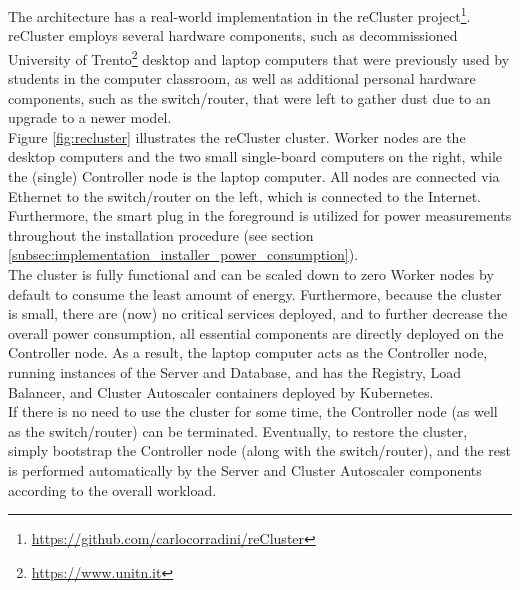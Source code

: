 The architecture has a real-world implementation in the reCluster project\footnote{\url{https://github.com/carlocorradini/reCluster}}.
\\ %
reCluster employs several hardware components, such as decommissioned University
of Trento\footnote{\url{https://www.unitn.it}} desktop and laptop computers that
were previously used by students in the computer classroom, as well as
additional personal hardware components, such as the switch/router, that were
left to gather dust due to an upgrade to a newer model. \\ %
Figure \ref{fig:recluster} illustrates the reCluster cluster. Worker nodes are the
desktop computers and the two small single-board computers on the right, while
the (single) Controller node is the laptop computer. All nodes are connected via
Ethernet to the switch/router on the left, which is connected to the Internet. Furthermore,
the smart plug in the foreground is utilized for power measurements throughout
the installation procedure (see section \ref{subsec:implementation_installer_power_consumption}).
\\ %
The cluster is fully functional and can be scaled down to zero Worker nodes by
default to consume the least amount of energy. Furthermore, because the cluster
is small, there are (now) no critical services deployed, and to further decrease
the overall power consumption, all essential components are directly deployed on
the Controller node. As a result, the laptop computer acts as the Controller node,
running instances of the Server and Database, and has the Registry, Load
Balancer, and Cluster Autoscaler containers deployed by Kubernetes. \\ %
If there is no need to use the cluster for some time, the Controller node (as well
as the switch/router) can be terminated. Eventually, to restore the cluster, simply
bootstrap the Controller node (along with the switch/router), and the rest is
performed automatically by the Server and Cluster Autoscaler components
according to the overall workload.

